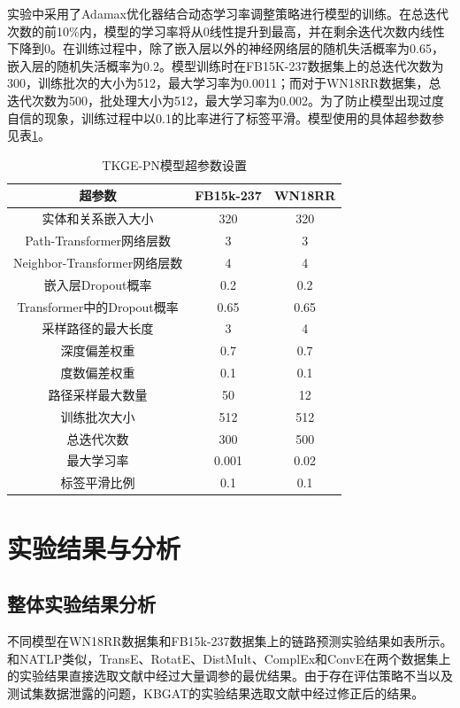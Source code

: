 实验中采用了Adamax优化器结合动态学习率调整策略进行模型的训练。在总迭代次数的前10\%内，模型的学习率将从0线性提升到最高，并在剩余迭代次数内线性下降到0。在训练过程中，除了嵌入层以外的神经网络层的随机失活概率为0.65，嵌入层的随机失活概率为0.2。模型训练时在FB15K-237数据集上的总迭代次数为300，训练批次的大小为512，最大学习率为0.0011；而对于WN18RR数据集，总迭代次数为500，批处理大小为512，最大学习率为0.002。为了防止模型出现过度自信的现象，训练过程中以0.1的比率进行了标签平滑。模型使用的具体超参数参见表\ref{TKGE-PN_hyperparameter}。

\begin{table}[htbp]
    \renewcommand\arraystretch{1.5}
    \caption{TKGE-PN模型超参数设置}
    \centering
    \begin{tabular}{*{3}{c}}
      \toprule
      超参数 & FB15k-237 & WN18RR\\
      \midrule
      实体和关系嵌入大小  & 320 & 320 \\
      Path-Transformer网络层数& 3 & 3\\
      Neighbor-Transformer网络层数& 4 & 4\\
      嵌入层Dropout概率 & 0.2 & 0.2\\
      Transformer中的Dropout概率 & 0.65 & 0.65\\
      采样路径的最大长度&3 &4\\
      深度偏差权重& 0.7 & 0.7\\
      度数偏差权重& 0.1 & 0.1\\
      路径采样最大数量 &50&12\\
      训练批次大小 & 512 & 512\\
      总迭代次数& 300 & 500 \\
      最大学习率 & 0.001 & 0.02\\
      标签平滑比例 & 0.1 & 0.1\\
      \bottomrule
    \end{tabular}
    \label{TKGE-PN_hyperparameter}
  \end{table}

\section{实验结果与分析}

\subsection{整体实验结果分析}

不同模型在WN18RR数据集和FB15k-237数据集上的链路预测实验结果如表所示。和NATLP类似，TransE、RotatE、DistMult、ComplEx和ConvE在两个数据集上的实验结果直接选取文献\cite{49}中经过大量调参的最优结果。由于存在评估策略不当以及测试集数据泄露的问题，KBGAT的实验结果选取文献\cite{50}中经过修正后的结果。

